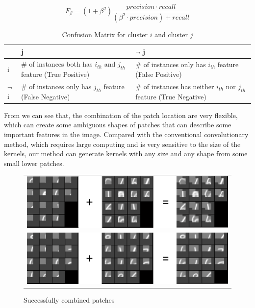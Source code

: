 \begin{equation}\label{eq:fm}
 {F_\beta } = \left( {1 + {\beta ^2}} \right)\frac{{precision \cdot recall}}{{\left( {{\beta ^2} \cdot precision} \right) + recall}}
\end{equation}
\begin{table}[H]
  \centering
  \begin{tabular}{ |l | p{5cm}| p{5cm}|}
  \hline
    & j & $\neg$ j \\
    \hline
  i& \# of instances both has $i_{th}$ and $ j_{th}$ feature (True Positive)& \# of instances only has $i_{th}$ feature (False Positive)\\
   \hline
  $\neg$ i & \# of instances only has $j_{th}$ feature (False Negative) & \# of instances has neither $i_{th}$ nor $ j_{th}$ feature (True Negative)\\
  \hline
\end{tabular}
  \caption{Confusion Matrix for cluster $i$ and cluster $j$}\label{confusion}
\end{table}
From  we can see that, the combination of the patch location are very flexible, which can create some ambiguous shapes of patches that can describe some important features in the image. Compared with the conventional convolutionary method, which requires large computing and is very sensitive to the size of the kernels, our method can generate kernels with any size and any shape from some small lower patches.
\begin{figure}[h]
 \centering
\begin{tabular}{c}
   \includegraphics[scale = .5]{fig/combine2.png}\\
   \includegraphics[scale = .5]{fig/combine.png}\\
\end{tabular}
  \caption{Successfully combined patches}\label{fig:comb}
\end{figure}

